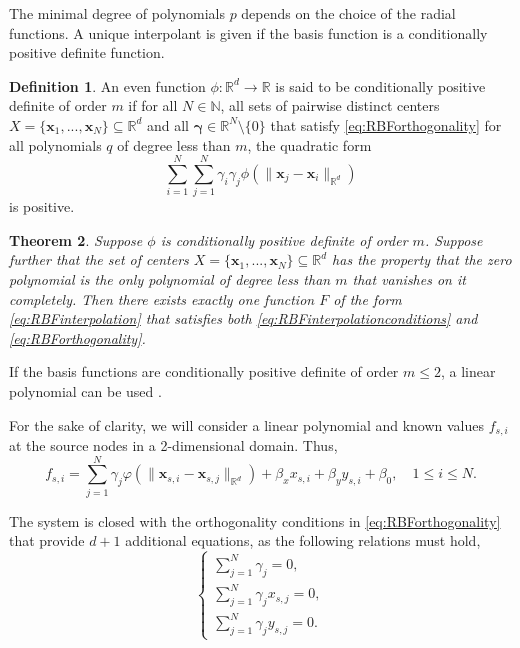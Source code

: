 \documentclass[12pt,a4paper]{article}
\theoremstyle{plain}
\newtheorem{thm}{Theorem} %
\theoremstyle{definition}
\newtheorem{defn}[thm]{Definition} %
\begin{document}
The minimal degree of polynomials $p$ depends on the choice of the radial functions. A unique interpolant is given if the basis function is a conditionally positive definite function. 

\begin{defn} \cite{beckert2001}
An even function $\phi: \mathbb{R}^d \rightarrow \mathbb{R}$ is said to be conditionally positive definite of order $m$ if for all $N \in \mathbb{N}$, all sets of pairwise distinct centers $X = \{ \mathbf{x}_1, ... , \mathbf{x}_N \} \subseteq \mathbb{R}^d$ and all $\mathbf{\gamma} \in \mathbb{R}^N \setminus \{ 0 \}$ that satisfy \eqref{eq:RBForthogonality} for all polynomials $q$ of degree less than $m$, the quadratic form
%
\begin{equation}
\sum_{i=1}^N \sum_{j=1}^N  \gamma_i \gamma_j \phi \left( \| \mathbf{x}_j - \mathbf{x}_i \|_{\mathbb{R}^d} \right)
\end{equation}
%
is positive.
\end{defn}

\begin{thm} \cite{beckert2001,wendland1996}
Suppose $\phi$ is conditionally positive definite of order $m$. Suppose further that the set of centers $X = \{ \mathbf{x}_1, ... , \mathbf{x}_N \} \subseteq \mathbb{R}^d$ has the property that the zero polynomial is the only polynomial of degree less than $m$ that vanishes on it completely. Then there exists exactly one function $F$ of the form \eqref{eq:RBFinterpolation} that satisfies both \eqref{eq:RBFinterpolationconditions} and \eqref{eq:RBForthogonality}.
\end{thm}

If the basis functions are conditionally positive definite of order $m \leq 2$, a linear polynomial can be used \cite{deboer2007}.

For the sake of clarity, we will consider a linear polynomial and known values $f_{s, i}$ at the source nodes in a 2-dimensional domain. Thus,
%
\begin{equation} \label{eq:RBFNequations}
f_{s,i} = \sum_{j=1}^N \gamma_j \varphi \left( \| \mathbf{x}_{s,i} - \mathbf{x}_{s, j} \|_{\mathbb{R}^d} \right) + \beta_x x_{s, i} + \beta_y y_{s, i} + \beta_0, \quad 1 \leq i \leq N.
\end{equation}

The system is closed with the orthogonality conditions in \eqref{eq:RBForthogonality} that provide $d + 1$ additional equations, as the following relations must hold,
%
\begin{equation} \label{eq:RBForthogonality2}
\begin{cases}
\displaystyle \sum_{j=1}^N \gamma_j = 0, \\
\displaystyle \sum_{j=1}^N \gamma_j x_{s,j}= 0, \\
\displaystyle \sum_{j=1}^N \gamma_j y_{s,j}= 0.
\end{cases}
\end{equation}
\end{document}
